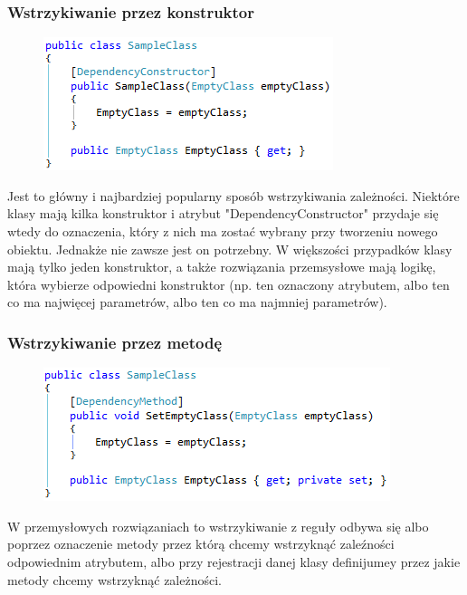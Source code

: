 \documentclass[12pt]{article}
\begin{document}
\subsubsection{Wstrzykiwanie przez konstruktor}
\begin{figure}[h]
	\begin{raggedleft}
  		\includegraphics{DependencyConstructor.png}
	\end{raggedleft}
\end{figure}
Jest to główny i najbardziej popularny sposób wstrzykiwania zależności. Niektóre klasy mają kilka konstruktor i atrybut "DependencyConstructor" przydaje się wtedy do oznaczenia, który z nich ma zostać wybrany przy tworzeniu nowego obiektu. Jednakże nie zawsze jest on potrzebny. W większości przypadków klasy mają tylko jeden konstruktor, a także rozwiązania przemsysłowe mają logikę, która wybierze odpowiedni konstruktor (np. ten oznaczony atrybutem, albo ten co ma najwięcej parametrów, albo ten co ma najmniej parametrów).

\subsubsection{Wstrzykiwanie przez metodę}
\begin{figure}[h]
	\begin{raggedleft}
  		\includegraphics{DependencyMethod.png}
	\end{raggedleft}
\end{figure}
W przemysłowych rozwiązaniach to wstrzykiwanie z reguły odbywa się albo poprzez oznaczenie metody przez którą chcemy wstrzyknąć zaleźności odpowiednim atrybutem, albo przy rejestracji danej klasy definijumey przez jakie metody chcemy wstrzyknąć zależności.
\end{document}
